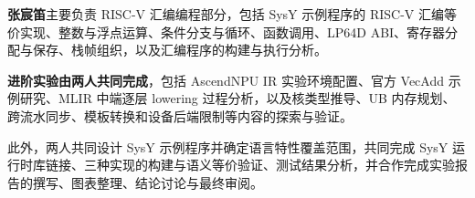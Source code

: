 \documentclass[UTF8,a4paper,12pt]{ctexart}
\begin{document}
\textbf{张宸笛}主要负责 RISC-V 汇编编程部分，包括 SysY 示例程序的 RISC-V 汇编等价实现、整数与浮点运算、条件分支与循环、函数调用、LP64D ABI、寄存器分配与保存、栈帧组织，以及汇编程序的构建与执行分析。

\textbf{进阶实验由两人共同完成}，包括 AscendNPU IR 实验环境配置、官方 VecAdd 示例研究、MLIR 中端逐层 lowering 过程分析，以及核类型推导、UB 内存规划、跨流水同步、模板转换和设备后端限制等内容的探索与验证。

此外，两人共同设计 SysY 示例程序并确定语言特性覆盖范围，共同完成 SysY 运行时库链接、三种实现的构建与语义等价验证、测试结果分析，并合作完成实验报告的撰写、图表整理、结论讨论与最终审阅。


\clearpage
\tableofcontents
\clearpage
{}








\end{document}
